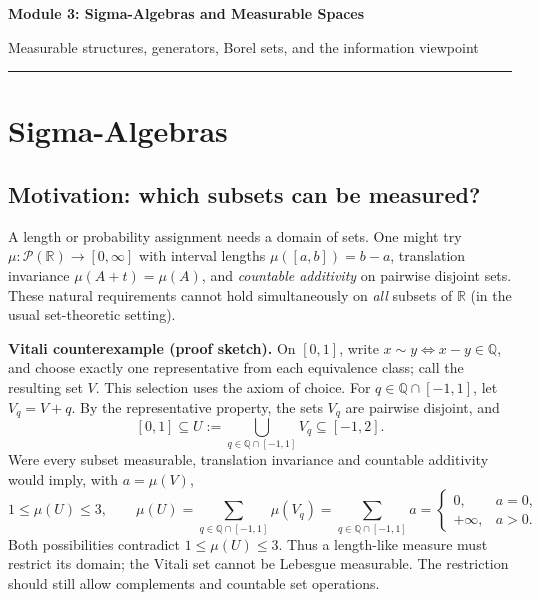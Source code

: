 \documentclass[10pt,a4paper]{article}
\newcommand{\R}{\mathbb R}
\newcommand{\Q}{\mathbb Q}
\begin{document}
\begin{center}
  {\LARGE\bfseries Module 3: Sigma-Algebras and Measurable Spaces}\par
  \vspace{5pt}
  {\small\color{muted}Measurable structures, generators, Borel sets, and the information viewpoint}\par
  \vspace{7pt}
  {\color{accent}\rule{0.88\linewidth}{0.7pt}}
\end{center}
\vspace{-4pt}

\section{Sigma-Algebras}
\subsection{Motivation: which subsets can be measured?}
A length or probability assignment needs a domain of sets. One might try
$\mu:\mathcal P(\R)\to[0,\infty]$ with interval lengths
$\mu([a,b])=b-a$, translation invariance $\mu(A+t)=\mu(A)$,
and \emph{countable additivity} on pairwise disjoint sets. These natural requirements
cannot hold simultaneously on \emph{all} subsets of $\R$ (in the usual set-theoretic setting).

\textbf{Vitali counterexample (proof sketch).} On $[0,1]$, write
$x\sim y\iff x-y\in\Q$, and choose exactly one representative from each
equivalence class; call the resulting set $V$. This selection uses the axiom of
choice. For $q\in\Q\cap[-1,1]$, let $V_q=V+q$. By the representative property,
the sets $V_q$ are pairwise disjoint, and
\[
[0,1]\subseteq U:=\bigcup_{q\in\Q\cap[-1,1]}V_q\subseteq[-1,2].
\]
Were every subset measurable, translation invariance and countable additivity
would imply, with $a=\mu(V)$,
\[
1\le\mu(U)\le3,\qquad
\mu(U)=\sum_{q\in\Q\cap[-1,1]}\mu(V_q)=\sum_{q\in\Q\cap[-1,1]}a
=\begin{cases}0,&a=0,\\+\infty,&a>0.\end{cases}
\]
Both possibilities contradict $1\le\mu(U)\le3$. Thus a length-like measure
must restrict its domain; the Vitali set cannot be Lebesgue measurable.
The restriction should still allow complements and countable set operations.
\end{document}
